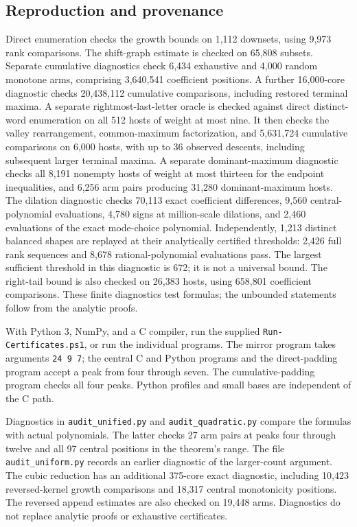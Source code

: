\subsection{Reproduction and provenance}
Direct enumeration checks the growth bounds on 1,112 downsets, using
9,973 rank comparisons. The shift-graph estimate is checked on 65,808
subsets. Separate cumulative diagnostics check 6,434 exhaustive and
4,000 random monotone arms, comprising
3,640,541 coefficient positions. A further 16,000-core diagnostic checks
20,438,112 cumulative comparisons, including restored terminal maxima.
A separate rightmost-last-letter oracle is checked against direct
distinct-word enumeration on all 512 hosts of weight at most nine.
It then checks the valley rearrangement, common-maximum factorization,
and 5,631,724 cumulative comparisons on 6,000 hosts, with up to 36 observed descents,
including subsequent larger terminal maxima.
A separate dominant-maximum diagnostic checks all 8,191 nonempty
hosts of weight at most thirteen for the endpoint inequalities, and
6,256 arm pairs producing 31,280 dominant-maximum hosts.
The dilation diagnostic checks 70,113 exact coefficient differences,
9,560 central-polynomial evaluations, 4,780 signs at million-scale
dilations, and 2,460 evaluations of the exact mode-choice polynomial.
Independently, 1,213 distinct balanced shapes are replayed at their
analytically certified thresholds: 2,426 full rank sequences and
8,678 rational-polynomial evaluations pass. The largest sufficient
threshold in this diagnostic is 672; it is not a universal bound.
The right-tail bound is also checked on 26,383 hosts, using 658,801
coefficient comparisons.
These finite diagnostics test formulas; the unbounded statements follow
from the analytic proofs.

With Python 3, NumPy, and a C compiler, run the supplied \texttt{Run-Certificates.ps1}, or run the individual programs. The mirror program takes arguments \texttt{24 9 7}; the central C and Python programs and the direct-padding program accept a peak from four through seven. The cumulative-padding program checks all four peaks. Python profiles and small bases are independent of the C path.

Diagnostics in \texttt{audit\_unified.py} and \texttt{audit\_quadratic.py} compare the formulas with actual polynomials. The latter checks 27 arm pairs at peaks four through twelve and all 97 central positions in the theorem's range. The file \texttt{audit\_uniform.py} records an earlier diagnostic of the larger-count argument. The cubic reduction has an additional 375-core exact diagnostic, including 10,423 reversed-kernel growth comparisons and 18,317 central monotonicity positions. The reversed append estimates are also checked on 19,448 arms. Diagnostics do not replace analytic proofs or exhaustive certificates.

